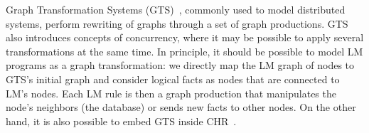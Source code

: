 Graph Transformation Systems (GTS)~\cite{Ehrig:2004vn}, commonly used to model
distributed systems, perform rewriting of graphs through a set of graph
productions. GTS also introduces concepts of concurrency, where it may be
possible to apply several transformations at the same time. In principle, it
should be possible to model LM programs as a graph transformation: we directly
map the LM graph of nodes to GTS's initial graph and consider logical facts as
nodes that are connected to LM's nodes. Each LM rule is then a graph production
that manipulates the node's neighbors (the database) or sends new facts to
other nodes. On the other hand, it is also possible to embed GTS inside
CHR~\cite{Raiser:2011:AGT:1972935.1972938}.
